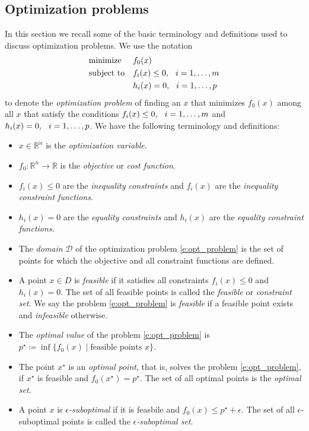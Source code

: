 \documentclass[11pt]{amsart}
\theoremstyle{definition}
\theoremstyle{remark}
\newcommand{\gap}{\hspace*{0.25cm}}
\begin{document}
    \subsection{Optimization problems}
        In this section we recall some of the basic terminology and definitions used to discuss optimization problems. We use the notation
        \begin{equation}\label{e:opt_problem}
            \begin{aligned}
            & {\text{minimize}} && f_0(x) \\
            & \text{subject to} && f_i(x) \leq 0, \gap i = 1, \dots, m \\
            &                   && h_i(x) = 0, \gap i = 1, \dots, p
            \end{aligned}
        \end{equation}
        to denote the \emph{optimization problem} of finding an $x$ that minimizes $f_0(x)$ among all $x$ that satisfy the conditions $f_i(x) \leq 0, \gap i = 1, \dots, m$ and $h_i(x) = 0, \gap i = 1, \dots, p$. We have the following terminology and definitions:
        \begin{itemize}
            \item $x \in \mathbb{R}^n$ is the \emph{optimization variable}.
            \item $f_0: \mathbb{R}^n \to \mathbb{R}$ is the \emph{objective} or \emph{cost function}.
            \item $f_i(x) \leq 0$ are the \emph{inequality constraints} and $f_i(x)$ are the \emph{inequality constraint functions}.
            \item $h_i(x) = 0$ are the \emph{equality constraints} and $h_i(x)$ are the \emph{equality constraint functions}. 
            \item The \emph{domain} $\mathcal{D}$ of the optimization problem \eqref{e:opt_problem} is the set of points for which the objective and all constraint functions are defined. 
            \item A point $x \in D$ is \emph{feasible} if it satisfies all constraints $f_i(x) \leq 0$ and $h_i(x) = 0$. The set of all feasible points is called the \emph{feasible} or \emph{constraint set}. We say the problem \eqref{e:opt_problem} is \emph{feasible} if a feasible point exists and \emph{infeasible} otherwise.
            \item The \emph{optimal value} of the problem \eqref{e:opt_problem} is
                  $p^\star \coloneqq \inf \{ f_0(x) \;|\; \text{feasible points } x \}$.
            \item The point $x^\star$ is an \emph{optimal point}, that is, solves the problem \eqref{e:opt_problem}, if $x^\star$ is feasible and $f_0(x^\star) = p^\star$. The set of all optimal points is the \emph{optimal set}. 
            \item A point $x$ is \emph{$\epsilon$-suboptimal} if it is feasbile and $f_0(x) \leq p^\star + \epsilon$. The set of all $\epsilon$-suboptimal points is called the \emph{$\epsilon$-suboptimal set}.
        \end{itemize} 
\end{document}

